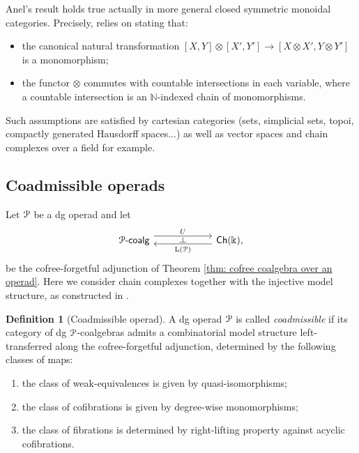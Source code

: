 \documentclass[a4paper,12pt]{amsart}
\renewcommand{\mathcal}{\EuScript}
\newcommand{\baseonecat}{\mathsf{Ch}(\kk)}
\newcommand{\oneop}{\mathcal{P}}
\newcommand{\onepcoalg}{\mathcal{P}\text{-}\mathsf{coalg}}
\theoremstyle{plain}
\theoremstyle{definition}
\newtheorem{definition}[theorem]{Definition}%
\theoremstyle{remark}
\newcommand{\kk}{\Bbbk}
\begin{document}
Anel's result holds true actually in more general closed symmetric monoidal categories. Precisely, \cite[Corollary 2.7.12]{anelcofree2014} relies on \cite[Hypothesis 2.7.5]{anelcofree2014} stating that:

\begin{itemize}
    \item the canonical natural transformation $[X,Y]\otimes [X',Y']\rightarrow [X\otimes X',Y\otimes Y']$ is a monomorphism;
    \item the functor $\otimes$ commutes with countable intersections in each variable, where a countable intersection is an $\mathbb{N}$-indexed chain of monomorphisms.
\end{itemize}

Such assumptions are satisfied by cartesian categories (sets, simplicial sets, topoi, compactly generated Hausdorff spaces...) as well as vector spaces and chain complexes over a field for example. 

\subsection{Coadmissible operads}
Let $\oneop$ be a dg operad and let 
\[
\begin{tikzcd}[column sep=5pc,row sep=3pc]
          \onepcoalg \arrow[r, shift left=1.1ex, "U"{name=F}] & \baseonecat , \arrow[l, shift left=.75ex, "\mathrm{L}(\oneop)"{name=U}]
            \arrow[phantom, from=F, to=U, , "\dashv" rotate=-90]
\end{tikzcd}
\]
be the cofree-forgetful adjunction of Theorem \ref{thm: cofree coalgebra over an operad}. Here we consider chain complexes together with the injective model structure, as constructed in \cite[Theorem 2.3.13]{Hovey}. 

\begin{definition}[Coadmissible operad]
A dg operad $\oneop$ is called \textit{coadmissible} if its category of dg $\oneop$-coalgebras admits a combinatorial model structure left-transferred along the cofree-forgetful adjunction, determined by the following classes of maps:
\begin{enumerate}
\item the class of weak-equivalences is given by quasi-isomorphisms;

\item the class of cofibrations is given by degree-wise monomorphisms;

\item the class of fibrations is determined by right-lifting property against acyclic cofibrations.
\end{enumerate}
\end{definition}
\end{document}
